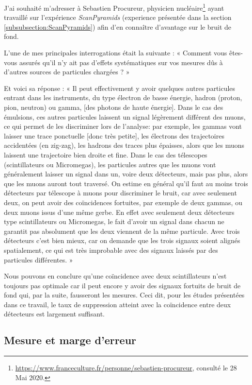 \documentclass[a4paper, 12pt]{article}
\begin{document}
\begin{spacing}{1.5}
J'ai souhaité m'adresser à Sebastien Procureur, physicien nucléaire\footnote{\url{https://www.franceculture.fr/personne/sebastien-procureur}, consulté le 28 Mai 2020.} ayant travaillé sur l'expérience \emph{ScanPyramids} (experience présentée dans la section \ref{subsubsection:ScanPyramids}) afin d'en connaître d'avantage sur le bruit de fond.

L'une de mes principales interrogations était la suivante : « Comment vous êtes-vous assurés qu’il n’y ait pas d’effets systématiques sur vos mesures dûs à d’autres sources de particules chargées ? »

Et voici sa réponse : « Il peut effectivement y avoir quelques autres particules entrant dans les instruments, du type électron de basse énergie, hadron (proton, pion, neutron) ou gamma, [des photons de haute énergie]. Dans le cas des émulsions, ces autres particules laissent un signal légèrement différent des muons, ce qui permet de les discriminer lors de l'analyse: par exemple, les gammas vont laisser une trace ponctuelle [donc très petite], les électrons des trajectoires accidentées (en zig-zag), les hadrons des traces plus épaisses, alors que les muons laissent une trajectoire bien droite et fine. Dans le cas des télescopes (scintillateurs ou Micromegas), les particules autres que les muons vont généralement laisser un signal dans un, voire deux détecteurs, mais pas plus, alors que les muons auront tout traversé. On estime en général qu'il faut au moins trois détecteurs par télescope à muons pour discriminer le bruit, car avec seulement deux, on peut avoir des coïncidences fortuites, par exemple de deux gammas, ou deux muons issus d'une même gerbe. En effet avec seulement deux détecteurs type scintillateurs ou Micromegas, le fait d'avoir un signal dans chacun ne garantit pas absolument que les deux viennent de la même particule. Avec trois détecteurs c'est bien mieux, car on demande que les trois signaux soient alignés spatialement, ce qui est très improbable avec des signaux laissés par des particules différentes. »

Nous pouvons en conclure qu'une coïncidence avec deux scintillateurs n'est toujours pas optimale car il peut encore y avoir des signaux fortuits de bruit de fond qui, par la suite, fausseront les mesures. Ceci dit, pour les études présentées dans ce travail, le taux de suppression atteint avec la coïncidence entre deux détecteurs est largement suffisant.

\subsection{Mesure et marge d'erreur}
\label{margederreur}


\end{spacing}
\end{document}
